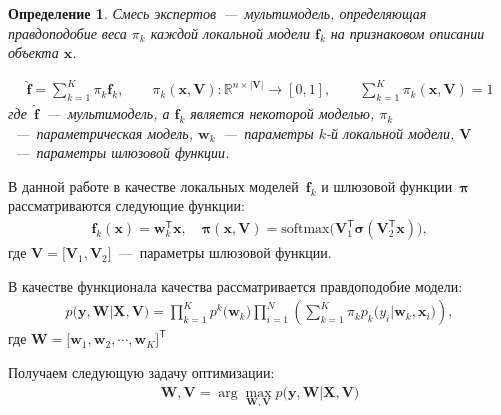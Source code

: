 \documentclass[12pt, twoside]{article}
\newtheorem{definition}{Определение}[section]
\numberwithin{equation}{section}
\begin{document}
\begin{definition}
\label{def:1}
Смесь экспертов~---~мультимодель, определяющая правдоподобие веса $\pi_k$ каждой локальной модели $\textbf{f}_k$ на признаковом описании объекта $\textbf{x}$.

\begin{equation}
\label{eq:st:2}
\begin{aligned}
\hat{\mathbf{f}} = \sum_{k=1}^{K}\pi_{k}\mathbf{f}_k, \qquad \pi_{k}\left(\mathbf{x}, \mathbf{V}\right):\mathbb{R}^{n\times \left|\mathbf{V}\right|} \to [0, 1], \qquad \sum_{k=1}^{K}\pi_{k}\left(\mathbf{x}, \mathbf{V}\right) = 1
\end{aligned}
\end{equation}
где~$\hat{\mathbf{f}}$~---~мультимодель, а $\mathbf{f}_k$ является некоторой моделью, $\pi_k$~---~параметрическая модель, $\mathbf{w}_k$~---~параметры $k$-й локальной модели, $\mathbf{V}$~---~параметры шлюзовой функции.
\end{definition}

В данной работе в качестве локальных моделей~$\mathbf{f}_k$ и шлюзовой функции~$\bm{\pi}$ рассматриваются следующие функции:
\begin{equation}
\label{eq:st:3}
\begin{aligned}
\mathbf{f}_k\left(\textbf{x}\right) = \textbf{w}_k^{\mathsf{T}}\textbf{x}, \quad
\bm{\pi}\left(\mathbf{x}, \mathbf{V}\right) = \text{softmax}\bigr(\mathbf{V}_{1}^{\mathsf{T}}\bm{\sigma}\left(\mathbf{V}_2^{\mathsf{T}}\mathbf{x}\right)\bigr),
\end{aligned}
\end{equation}
где $\mathbf{V} = \bigr[\mathbf{V}_1, \mathbf{V}_2\bigr]$~---~параметры шлюзовой функции.

В качестве функционала качества рассматривается правдоподобие модели:
\begin{equation}
\label{eq:st:4}
\begin{aligned}
p\bigr(\mathbf{y}, \mathbf{W}|\mathbf{X}, \mathbf{V}\bigr) = \prod_{k=1}^{K}p^{k}\bigr(\mathbf{w}_k\bigr)\prod_{i=1}^{N}\left(\sum_{k=1}^{K}\pi_{k}p_{k}\bigr(y_i|\mathbf{w}_k, \mathbf{x}_i\bigr)\right),
\end{aligned}
\end{equation}
где $\mathbf{W} = \bigr[\mathbf{w}_1, \mathbf{w}_2, \cdots, \mathbf{w}_K\bigr]^{\mathsf{T}}$

Получаем следующую задачу оптимизации:
\begin{equation}
\label{eq:st:5}
\begin{aligned}
\mathbf{W}, \mathbf{V} = \arg\max_{\mathbf{W}, \mathbf{V}} p\bigr(\mathbf{y}, \mathbf{W}|\mathbf{X}, \mathbf{V}\bigr)
\end{aligned}
\end{equation}
\end{document}
